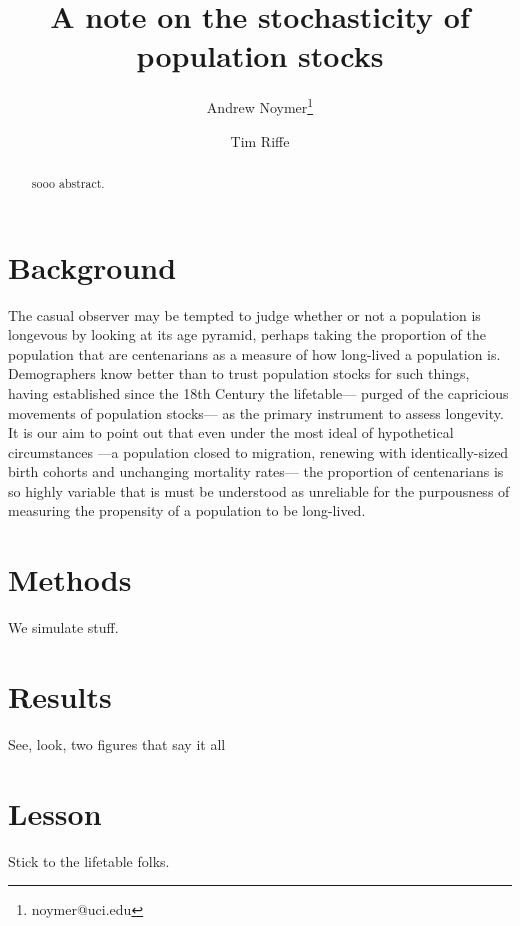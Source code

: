 \documentclass[12pt,oneside,a4paper]{article} %
\theoremstyle{definition}
\begin{document}
\title{A note on the stochasticity of population stocks}
\author[1]{Andrew Noymer\thanks{noymer@uci.edu}}
\author[2]{Tim Riffe}




\maketitle

\begin{abstract}
sooo abstract.
\end{abstract}

\section{Background}
The casual observer may be tempted to judge whether or not a population is
longevous by looking at its age pyramid, perhaps taking the proportion of
the population that are centenarians as a measure of how long-lived a population
is. Demographers know better than to trust population stocks for such things,
having established since the 18th Century \citep{graunt1939natural} the
lifetable--- purged of the capricious movements of population stocks--- as the primary instrument to assess
longevity. It is our aim to point out that even under the most ideal of
hypothetical circumstances ---a population closed to migration, renewing with
identically-sized birth cohorts and unchanging mortality rates--- the proportion
of centenarians is so highly variable that is must be understood as unreliable
for the purpousness of measuring the propensity of a population to be
long-lived.

\section{Methods}

We simulate stuff.

\section{Results}

See, look, two figures that say it all

\section{Lesson}
Stick to the lifetable folks.

 
%
 
\end{document}
